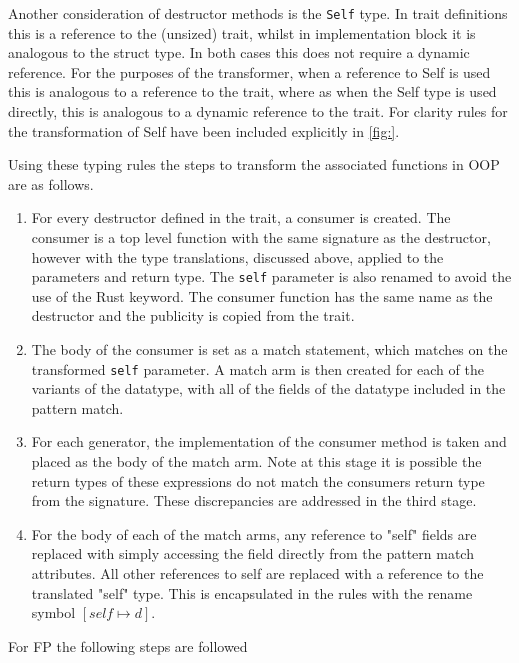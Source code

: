 \documentclass[ oneside,%
                    author={James Elgar},
                    degree={MEng},
                     title={Bidirectional transformer between functional and \\ object-oriented programming in Rust},
                  subtitle={}]{dissertation}
\begin{document}
Another consideration of destructor methods is the \verb|Self| type. In trait definitions this is a reference to the (unsized) trait, whilst in implementation block it is analogous to the struct type. In both cases this does not require a dynamic reference. For the purposes of the transformer, when a reference to Self is used this is analogous to a reference to the trait, where as when the Self type is used directly, this is analogous to a dynamic reference to the trait. For clarity rules for the transformation of Self have been included explicitly in \autoref{fig:}.

Using these typing rules the steps to transform the associated functions in OOP are as follows.

\begin{enumerate}
    \item For every destructor defined in the trait, a consumer is created. The consumer is a top level function with the same signature as the destructor, however with the type translations, discussed above, applied to the parameters and return type. The \verb|self| parameter is also renamed to avoid the use of the Rust keyword. The consumer function has the same name as the destructor and the publicity is copied from the trait.
    \item The body of the consumer is set as a match statement, which matches on the transformed \verb|self| parameter. A match arm is then created for each of the variants of the datatype, with all of the fields of the datatype included in the pattern match.
    \item For each generator, the implementation of the consumer method is taken and placed as the body of the match arm. Note at this stage it is possible the return types of these expressions do not match the consumers return type from the signature. These discrepancies are addressed in the third stage.
    \item For the body of each of the match arms, any reference to "self" fields are replaced with simply accessing the field directly from the pattern match attributes. All other references to self are replaced with a reference to the translated "self" type. This is encapsulated in the rules with the rename symbol $[self \mapsto d]$. 
\end{enumerate}

For FP  the following steps are followed
\end{document}
